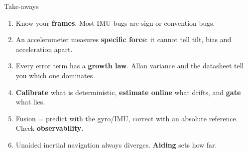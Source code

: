 \begin{frame}{Take-aways}
  \begin{enumerate}
    \item Know your \textbf{frames}. Most IMU bugs are sign or convention bugs.
    \item An accelerometer measures \textbf{specific force}: it cannot tell tilt, bias and acceleration apart.
    \item Every error term has a \textbf{growth law}. Allan variance and the datasheet tell you which one dominates.
    \item \textbf{Calibrate} what is deterministic, \textbf{estimate online} what drifts, and \textbf{gate} what lies.
    \item Fusion = predict with the gyro/IMU, correct with an absolute reference. Check \textbf{observability}.
    \item Unaided inertial navigation always diverges. \textbf{Aiding} sets how far.
  \end{enumerate}
\end{frame}
